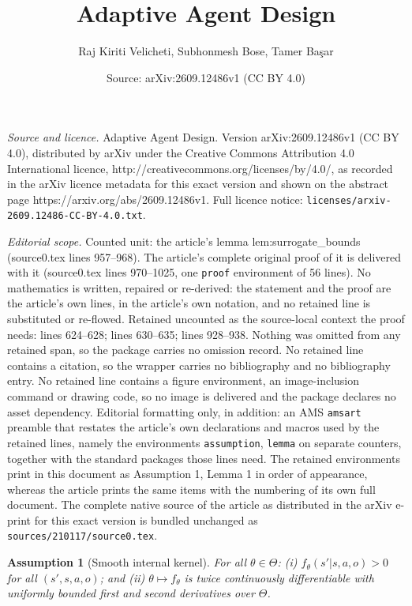 \documentclass[10pt,a4paper]{amsart}
\title{Adaptive Agent Design}
\author{Raj Kiriti Velicheti, Subhonmesh Bose, Tamer Ba\c{s}ar}
\date{Source: arXiv:2609.12486v1 (CC BY 4.0)}
\newtheorem{assumption}{Assumption}
\begin{document}
\maketitle

\noindent\emph{Source and licence.} Adaptive Agent Design. Version arXiv:2609.12486v1 (CC BY 4.0), distributed by arXiv under the Creative Commons Attribution 4.0 International licence, http://creativecommons.org/licenses/by/4.0/, as recorded in the arXiv licence metadata for this exact version and shown on the abstract page https://arxiv.org/abs/2609.12486v1. Full licence notice: \texttt{licenses/arxiv-2609.12486-CC-BY-4.0.txt}.\par\smallskip

\noindent\textit{Editorial scope.} Counted unit: the article's lemma lem:surrogate\_bounds (source0.tex lines 957--968). The article's complete original proof of it is delivered with it (source0.tex lines 970--1025, one \texttt{proof} environment of 56 lines). No mathematics is written, repaired or re-derived: the statement and the proof are the article's own lines, in the article's own notation, and no retained line is substituted or re-flowed.  Retained uncounted as the source-local context the proof needs: lines 624--628; lines 630--635; lines 928--938.  Nothing was omitted from any retained span, so the package carries no omission record.  No retained line contains a citation, so the wrapper carries no bibliography and no bibliography entry.  No retained line contains a figure environment, an image-inclusion command or drawing code, so no image is delivered and the package declares no asset dependency.  Editorial formatting only, in addition: an AMS \texttt{amsart} preamble that restates the article's own declarations and macros used by the retained lines, namely the environments \texttt{assumption}, \texttt{lemma} on separate counters, together with the standard packages those lines need.  The retained environments print in this document as Assumption 1, Lemma 1 in order of appearance, whereas the article prints the same items with the numbering of its own full document.  The complete native source of the article as distributed in the arXiv e-print for this exact version is bundled unchanged as \texttt{sources/210117/source0.tex}.
\begin{assumption}[Smooth internal kernel]\label{ass:smooth_kernel}
For all $\theta \in \Theta$: (i) $f_\theta(s'|s,a,o) > 0$ for all $(s',s,a,o)$; and
(ii) $\theta \mapsto f_\theta$ is twice continuously differentiable with uniformly
bounded first and second derivatives over $\Theta$.
\end{assumption}
\end{document}
